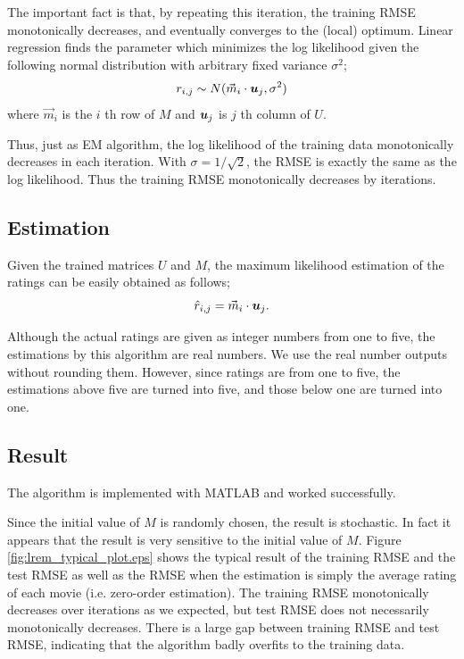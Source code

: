 \documentclass{article}
\begin{document}
The important fact is that, by repeating this iteration, the training RMSE monotonically decreases, and eventually converges to the (local) optimum. Linear regression finds the parameter which minimizes the log likelihood given the following normal distribution with arbitrary fixed variance $\sigma^2$;
\begin{equation}
r_{i,j}\sim N(\vec{m}_i \cdot {{\mbox{\boldmath $u$}}}_j, \sigma^2)
\end{equation}
where $\vec{m}_i$ is the $i$ th row of $M$ and ${{\mbox{\boldmath $u$}}}_j$ is $j$ th column of $U$.

Thus, just as EM algorithm, the log likelihood of the training data monotonically decreases in each iteration. With $\sigma = 1/\sqrt{2}$, the RMSE is exactly the same as the log likelihood. Thus the training RMSE monotonically decreases by iterations.

\subsection{Estimation}
Given the trained matrices $U$ and $M$, the maximum likelihood estimation of the ratings can be easily obtained as follows;
\begin{equation}
\hat{r}_{i,j}=\vec{m}_i \cdot {{\mbox{\boldmath $u$}}}_j.
\end{equation}

Although the actual ratings are given as integer numbers from one to five, the estimations by this algorithm are real numbers. We use the real number outputs without rounding them. However, since ratings are from one to five, the estimations above five are turned into five, and those below one are turned into one. %

\subsection{Result}

The algorithm is implemented with MATLAB and worked successfully.

Since the initial value of $M$ is randomly chosen, the result is stochastic. In fact it appears that the result is very sensitive to the initial value of $M$. Figure \ref{fig:lrem_typical_plot.eps} shows the typical result of the training RMSE and the test RMSE as well as the RMSE when the estimation is simply the average rating of each movie (i.e. zero-order estimation). The training RMSE monotonically decreases over iterations as we expected, but test RMSE does not necessarily monotonically decreases. There is a large gap between training RMSE and test RMSE, indicating that the algorithm badly overfits to the training data.
\end{document}
